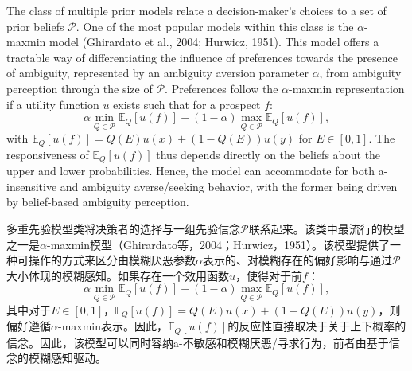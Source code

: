 \documentclass[12pt,a4paper]{article}
\newenvironment{original}
  {\par\medskip\noindent\color{black}\ignorespaces}
  {\par\medskip}
\newenvironment{translation}
  {\par\noindent\color{transblue}\ignorespaces}
  {\par\medskip\medskip}
\begin{document}
\begin{original}
The class of multiple prior models relate a decision-maker's choices to a set of prior beliefs $\mathcal{P}$. One of the most popular models within this class is the $\alpha$-maxmin model (Ghirardato et al., 2004; Hurwicz, 1951). This model offers a tractable way of differentiating the influence of preferences towards the presence of ambiguity, represented by an ambiguity aversion parameter $\alpha$, from ambiguity perception through the size of $\mathcal{P}$. Preferences follow the $\alpha$-maxmin representation if a utility function $u$ exists such that for a prospect $f$:
\begin{equation}
\alpha \min_{Q \in \mathcal{P}} \mathbb{E}_Q[u(f)] + (1 - \alpha) \max_{Q \in \mathcal{P}} \mathbb{E}_Q[u(f)],
\end{equation}
with $\mathbb{E}_Q[u(f)] = Q(E) u(x) + (1 - Q(E)) u(y)$ for $E \in [0,1]$. The responsiveness of $\mathbb{E}_Q[u(f)]$ thus depends directly on the beliefs about the upper and lower probabilities. Hence, the model can accommodate for both a-insensitive and ambiguity averse/seeking behavior, with the former being driven by belief-based ambiguity perception.
\end{original}

\begin{translation}
多重先验模型类将决策者的选择与一组先验信念$\mathcal{P}$联系起来。该类中最流行的模型之一是$\alpha$-maxmin模型（Ghirardato等，2004；Hurwicz，1951）。该模型提供了一种可操作的方式来区分由模糊厌恶参数$\alpha$表示的、对模糊存在的偏好影响与通过$\mathcal{P}$大小体现的模糊感知。如果存在一个效用函数$u$，使得对于前$f$：
\begin{equation}
\alpha \min_{Q \in \mathcal{P}} \mathbb{E}_Q[u(f)] + (1 - \alpha) \max_{Q \in \mathcal{P}} \mathbb{E}_Q[u(f)],
\end{equation}
其中对于$E \in [0,1]$，$\mathbb{E}_Q[u(f)] = Q(E) u(x) + (1 - Q(E)) u(y)$，则偏好遵循$\alpha$-maxmin表示。因此，$\mathbb{E}_Q[u(f)]$的反应性直接取决于关于上下概率的信念。因此，该模型可以同时容纳a-不敏感和模糊厌恶/寻求行为，前者由基于信念的模糊感知驱动。
\end{translation}
\end{document}
